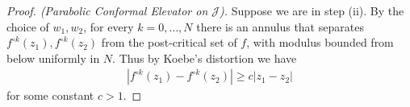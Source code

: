 \begin{proof}[Proof. (Parabolic Conformal Elevator on $\mathcal J$)]
Suppose we are in step (ii). By the choice of $w_1,w_2$, for every $k=0,\dots,N$ there is an annulus that separates $f^{\circ k}(z_1),f^{\circ k}(z_2)$ from the post-critical set of $f$, with modulus bounded from below uniformly in $N$.
Thus by Koebe's distortion we have 
\begin{align*}
|f^{\circ k}(z_1)-f^{\circ k}(z_2)|\geq c |z_1-z_2|
\end{align*}
for some constant $c>1$.

%
%
\end{proof}



